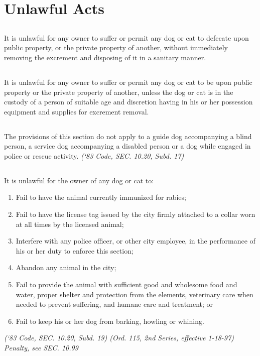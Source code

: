 \section{Unlawful Acts}
\subsection{}
It is unlawful for any owner to suffer or permit any dog or cat to defecate upon public property, or the private property of another, without immediately removing the excrement and disposing of it in a sanitary manner.
\subsection{}
It is unlawful for any owner to suffer or permit any dog or cat to be upon public property or the private property of another, unless the dog or cat is in the custody of a person of suitable age and discretion having in his or her possession equipment and supplies for excrement removal.
\subsection{}
The provisions of this section do not apply to a guide dog accompanying a blind person, a service dog accompanying a disabled person or a dog while engaged in police or rescue activity. \emph{(‘83 Code, SEC. 10.20, Subd. 17)}
\subsection{}
It is unlawful for the owner of any dog or cat to:
\begin{enumerate}[{\indent}1)]
\item Fail to have the animal currently immunized for rabies;
\item Fail to have the license tag issued by the city firmly attached to a collar worn at all times by the licensed animal;
\item Interfere with any police officer, or other city employee, in the performance of his or her duty to enforce this section;
\item Abandon any animal in the city;
\item Fail to provide the animal with sufficient good and wholesome food and water, proper shelter and protection from the elements, veterinary care when needed to prevent suffering, and humane care and treatment; or 
\item Fail to keep his or her dog from barking, howling or whining.
\end{enumerate}
\emph{(‘83 Code, SEC. 10.20, Subd. 19)  (Ord. 115, 2nd Series, effective 1-18-97)  Penalty, see SEC. 10.99}

